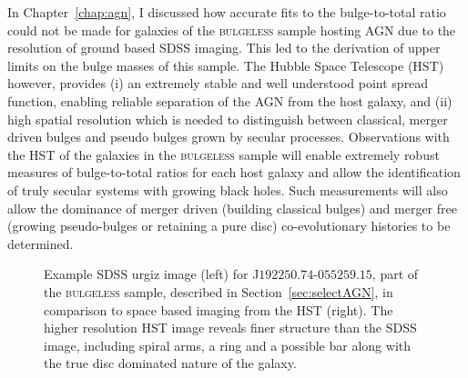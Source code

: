 In Chapter~\ref{chap:agn}, I discussed how accurate fits to the bulge-to-total ratio could not be made for galaxies of the \textsc{bulgeless} sample hosting AGN due to the resolution of ground based SDSS imaging. This led to the derivation of upper limits on the bulge masses of this sample. The Hubble Space Telescope (HST) however, provides (i) an extremely stable and well understood point spread function, enabling reliable separation of the AGN from the host galaxy, and (ii) high spatial resolution which is needed to distinguish between classical, merger driven bulges and pseudo bulges grown by secular processes. Observations with the HST of the galaxies in the \textsc{bulgeless} sample will enable extremely robust measures of bulge-to-total ratios for each host galaxy and allow the identification of truly secular systems with growing black holes. Such measurements will also allow the dominance of merger driven (building classical bulges) and merger free (growing pseudo-bulges or retaining a pure disc) co-evolutionary histories to be determined. 

\begin{figure}
\caption[Example HST image data in comparison to SDSS]{Example SDSS urgiz image (left) for J$192250.74$-$055259.15$, part of the \textsc{bulgeless} sample, described in Section~\ref{sec:selectAGN}, in comparison to space based imaging from the HST (right). The higher resolution HST image reveals finer structure than the SDSS image, including spiral arms, a ring and a possible bar along with the true disc dominated nature of the galaxy.}
\label{fig:hstdata}
\end{figure}



